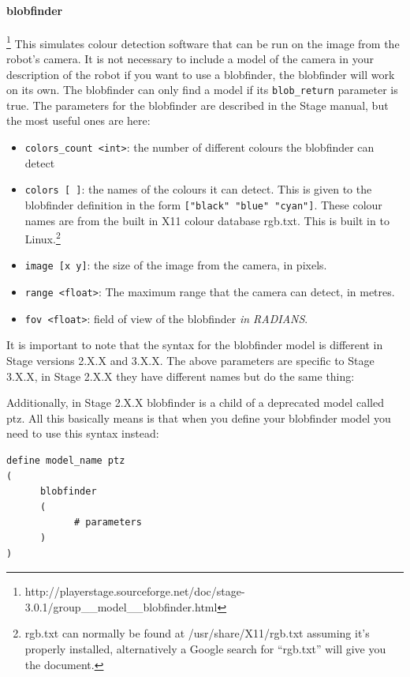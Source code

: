 \documentclass[a4paper]{article}
\begin{document}
\paragraph{blobfinder}\footnote{http://playerstage.sourceforge.net/doc/stage-3.0.1/group\_\_model\_\_blobfinder.html}
This simulates colour detection software that can be run on the image from the robot's camera. It is not necessary to include a model of the camera in your description of the robot if you want to use a blobfinder, the blobfinder will work on its own. The blobfinder can only find a model if its \verb|blob_return| parameter is true. The parameters for the blobfinder are described in the Stage manual, but the most useful ones are here:
\begin{itemize}
\item \verb|colors_count <int>|: the number of different colours the blobfinder can detect
\item \verb|colors [ ]|: the names of the colours it can detect. This is given to the blobfinder definition in the form \verb|["black" "blue" "cyan"]|. These colour names are from the built in X11 colour database rgb.txt. This is built in to Linux.\footnote{rgb.txt can normally be found at /usr/share/X11/rgb.txt assuming it's properly installed, alternatively a Google search for ``rgb.txt'' will give you the document.}
\item \verb|image [x y]|: the size of the image from the camera, in pixels.
\item \verb|range <float>|: The maximum range that the camera can detect, in metres.
\item \verb|fov <float>|: field of view of the blobfinder \emph{in RADIANS}.
\end{itemize}
It is important to note that the syntax for the blobfinder model is different in Stage versions 2.X.X and 3.X.X. The above parameters are specific to Stage 3.X.X, in Stage 2.X.X they have different names but do the same thing:
Additionally, in Stage 2.X.X blobfinder is a child of a deprecated model called ptz. All this basically means is that when you define your blobfinder model you need to use this syntax instead:
\begin{verbatim}
define model_name ptz
(
      blobfinder
      (
            # parameters
      )
)
\end{verbatim}
\end{document}
